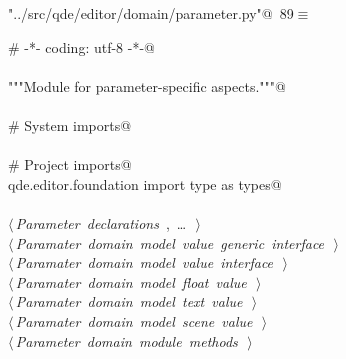 \documentclass[
    a4paper,      %
    10pt,         %
    openright,    %
    notitlepage,  %
    parskip=half, %
]{scrreprt}       %
\theoremstyle{definition}                    %
\begin{document}
\begin{flushleft} \small
\begin{minipage}{\linewidth}\label{scrap146}\raggedright\small
{} \verb@"../src/qde/editor/domain/parameter.py"@\nobreak\ {\footnotesize {89}}$\equiv$
\vspace{-1ex}
\begin{list}{}{} \item
\mbox{}\lstinline@# -*- coding: utf-8 -*-@\\
\mbox{}\lstinline@@\\
\mbox{}\lstinline@"""Module for parameter-specific aspects."""@\\
\mbox{}\lstinline@@\\
\mbox{}\lstinline@# System imports@\\
\mbox{}\lstinline@@\\
\mbox{}\lstinline@# Project imports@\\
\mbox{}\lstinline@from qde.editor.foundation import type as types@\\
\mbox{}\lstinline@@\\
\mbox{}\lstinline@@\hbox{$\langle\,${\itshape Parameter declarations}\nobreak\ {\footnotesize {}, \ldots\ }$\,\rangle$}\lstinline@@\\
\mbox{}\lstinline@@\hbox{$\langle\,${\itshape Paramater domain model value generic interface}\nobreak\ {\footnotesize {}}$\,\rangle$}\lstinline@@\\
\mbox{}\lstinline@@\hbox{$\langle\,${\itshape Paramater domain model value interface}\nobreak\ {\footnotesize {}}$\,\rangle$}\lstinline@@\\
\mbox{}\lstinline@@\hbox{$\langle\,${\itshape Paramater domain model float value}\nobreak\ {\footnotesize {}}$\,\rangle$}\lstinline@@\\
\mbox{}\lstinline@@\hbox{$\langle\,${\itshape Paramater domain model text value}\nobreak\ {\footnotesize {}}$\,\rangle$}\lstinline@@\\
\mbox{}\lstinline@@\hbox{$\langle\,${\itshape Paramater domain model scene value}\nobreak\ {\footnotesize {}}$\,\rangle$}\lstinline@@\\
\mbox{}\lstinline@@\hbox{$\langle\,${\itshape Parameter domain module methods}\nobreak\ {\footnotesize {}}$\,\rangle$}\lstinline@@\\
\mbox{}\lstinline@@{\NWsep}
\end{list}
\vspace{-1.5ex}
\footnotesize
\begin{list}{}{\setlength{\itemsep}{-\parsep}\setlength{\itemindent}{-\leftmargin}}

\item{}
\end{list}
\end{minipage}\vspace{4ex}
\end{flushleft}
\end{document}
